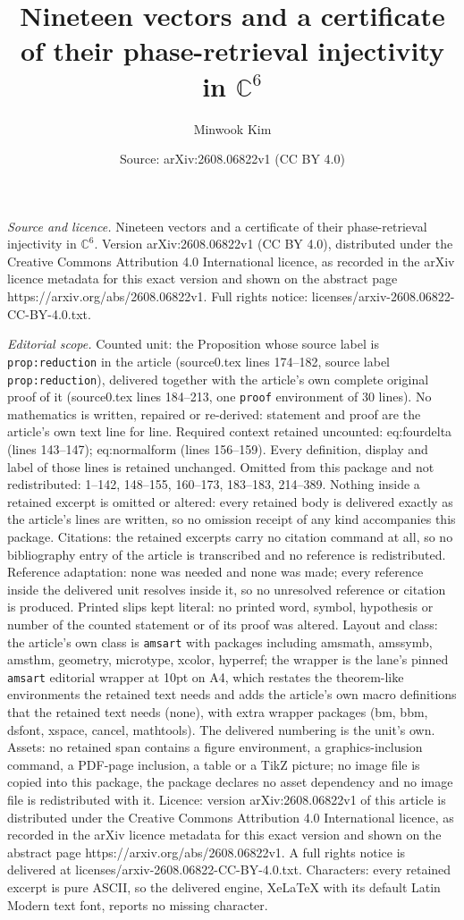 \documentclass[10pt,a4paper]{amsart}
\title[Nineteen vectors and a certificate of their phase-retrieval ]{Nineteen vectors and a certificate of their phase-retrieval injectivity in $\mathbb{C}^6$}
\author{Minwook Kim}
\date{Source: arXiv:2608.06822v1 (CC BY 4.0)}
\begin{document}
\maketitle

\noindent\emph{Source and licence.} Nineteen vectors and a certificate of their phase-retrieval injectivity in $\mathbb{C}^6$. Version arXiv:2608.06822v1 (CC BY 4.0), distributed under the Creative Commons Attribution 4.0 International licence, as recorded in the arXiv licence metadata for this exact version and shown on the abstract page https://arxiv.org/abs/2608.06822v1. Full rights notice: licenses/arxiv-2608.06822-CC-BY-4.0.txt.\par\smallskip

\noindent\textit{Editorial scope.} Counted unit: the Proposition whose source label is \texttt{prop:reduction} in the article (source0.tex lines 174--182, source label \texttt{prop:reduction}), delivered together with the article's own complete original proof of it (source0.tex lines 184--213, one \texttt{proof} environment of 30 lines). No mathematics is written, repaired or re-derived: statement and proof are the article's own text line for line. Required context retained uncounted: eq:fourdelta (lines 143--147); eq:normalform (lines 156--159). Every definition, display and label of those lines is retained unchanged. Omitted from this package and not redistributed: 1--142, 148--155, 160--173, 183--183, 214--389. Nothing inside a retained excerpt is omitted or altered: every retained body is delivered exactly as the article's lines are written, so no omission receipt of any kind accompanies this package. Citations: the retained excerpts carry no citation command at all, so no bibliography entry of the article is transcribed and no reference is redistributed. Reference adaptation: none was needed and none was made; every reference inside the delivered unit resolves inside it, so no unresolved reference or citation is produced. Printed slips kept literal: no printed word, symbol, hypothesis or number of the counted statement or of its proof was altered. Layout and class: the article's own class is \texttt{amsart} with packages including amsmath, amssymb, amsthm, geometry, microtype, xcolor, hyperref; the wrapper is the lane's pinned \texttt{amsart} editorial wrapper at 10pt on A4, which restates the theorem-like environments the retained text needs and adds the article's own macro definitions that the retained text needs (none), with extra wrapper packages (bm, bbm, dsfont, xspace, cancel, mathtools). The delivered numbering is the unit's own. Assets: no retained span contains a figure environment, a graphics-inclusion command, a PDF-page inclusion, a table or a TikZ picture; no image file is copied into this package, the package declares no asset dependency and no image file is redistributed with it. Licence: version arXiv:2608.06822v1 of this article is distributed under the Creative Commons Attribution 4.0 International licence, as recorded in the arXiv licence metadata for this exact version and shown on the abstract page https://arxiv.org/abs/2608.06822v1. A full rights notice is delivered at licenses/arxiv-2608.06822-CC-BY-4.0.txt. Characters: every retained excerpt is pure ASCII, so the delivered engine, XeLaTeX with its default Latin Modern text font, reports no missing character.
\end{document}
